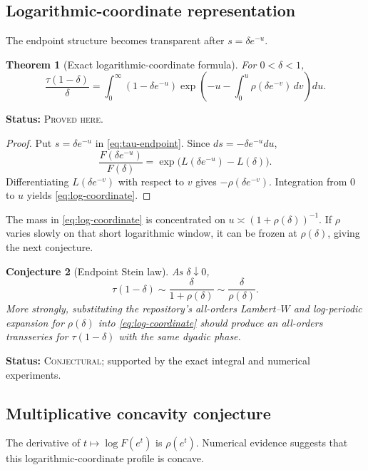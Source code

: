 \documentclass[11pt,oneside]{article}
\newtheorem{theorem}{Theorem}[section]
\newtheorem{conjecture}[theorem]{Conjecture}
\theoremstyle{definition}
\theoremstyle{remark}
\newcommand{\ProvedHere}{\textcolor{statusgreen}{\textsc{Proved here}}}
\newcommand{\Conjectural}{\textcolor{statusred}{\textsc{Conjectural}}}
\newcommand{\Status}[1]{\par\smallskip\noindent\textbf{Status:} #1.\par\smallskip}
\begin{document}
\subsection{Logarithmic-coordinate representation}
The endpoint structure becomes transparent after $s=\delta e^{-u}$.

\begin{theorem}[Exact logarithmic-coordinate formula]\label{thm:log-coordinate}
For $0<\delta<1$,
\begin{equation}\label{eq:log-coordinate}
 \frac{\tau(1-\delta)}{\delta}
 =\int_0^\infty
 (1-\delta e^{-u})
 \exp\!\left(
   -u-\int_0^u\rho(\delta e^{-v})\,dv
 \right)du.
\end{equation}
\end{theorem}
\Status{\ProvedHere}

\begin{proof}
Put $s=\delta e^{-u}$ in \eqref{eq:tau-endpoint}.  Since
$ds=-\delta e^{-u}du$,
\[
 \frac{F(\delta e^{-u})}{F(\delta)}
 =\exp\bigl(L(\delta e^{-u})-L(\delta)\bigr).
\]
Differentiating $L(\delta e^{-v})$ with respect to $v$ gives
$-\rho(\delta e^{-v})$.  Integration from $0$ to $u$ yields
\eqref{eq:log-coordinate}.
\end{proof}

The mass in \eqref{eq:log-coordinate} is concentrated on
$u\asymp(1+\rho(\delta))^{-1}$.  If $\rho$ varies slowly on that short logarithmic
window, it can be frozen at $\rho(\delta)$, giving the next conjecture.

\begin{conjecture}[Endpoint Stein law]\label{conj:stein-endpoint}
As $\delta\downarrow0$,
\begin{equation}\label{eq:stein-endpoint-conj}
 \tau(1-\delta)
 \sim\frac{\delta}{1+\rho(\delta)}
 \sim\frac{\delta}{\rho(\delta)}.
\end{equation}
More strongly, substituting the repository's all-orders Lambert--$W$ and
log-periodic expansion for $\rho(\delta)$ into \eqref{eq:log-coordinate} should
produce an all-orders transseries for $\tau(1-\delta)$ with the same dyadic phase.
\end{conjecture}
\Status{\Conjectural; supported by the exact integral and numerical experiments}

\subsection{Multiplicative concavity conjecture}
The derivative of $t\mapsto\log F(e^t)$ is $\rho(e^t)$.  Numerical evidence
suggests that this logarithmic-coordinate profile is concave.
\end{document}
